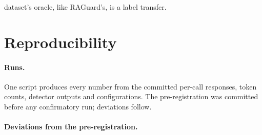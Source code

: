dataset's oracle, like RAGuard's, is a label transfer.

\section{Reproducibility}
\label{app:repro}
\paragraph{Runs.} One script produces every number from the committed per-call responses,
token counts, detector outputs and configurations. The pre-registration was committed before any confirmatory run;
deviations follow.

\paragraph{Deviations from the pre-registration.}
